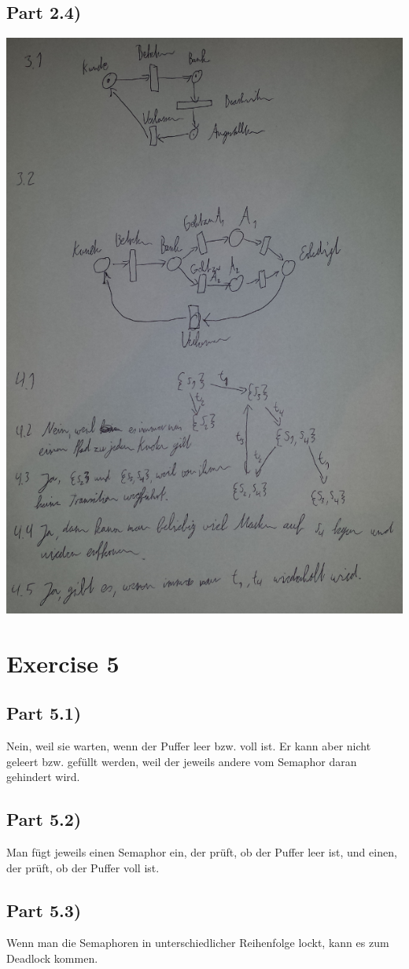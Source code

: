 \documentclass[10pt,a4paper]{article}
\begin{document}
\subsection*{Part 2.4)}

\includegraphics[width=450pt]{sheet-3/4}

\section*{Exercise 5}

\subsection*{Part 5.1)}

Nein, weil sie warten, wenn der Puffer leer bzw. voll ist.
Er kann aber nicht geleert bzw. gefüllt werden, weil der jeweils andere vom Semaphor daran gehindert wird.

\subsection*{Part 5.2)}

Man fügt jeweils einen Semaphor ein, der prüft, ob der Puffer leer ist, und einen, der prüft, ob der Puffer voll ist.

\subsection*{Part 5.3)}

Wenn man die Semaphoren in unterschiedlicher Reihenfolge lockt, kann es zum Deadlock kommen.
\end{document}
